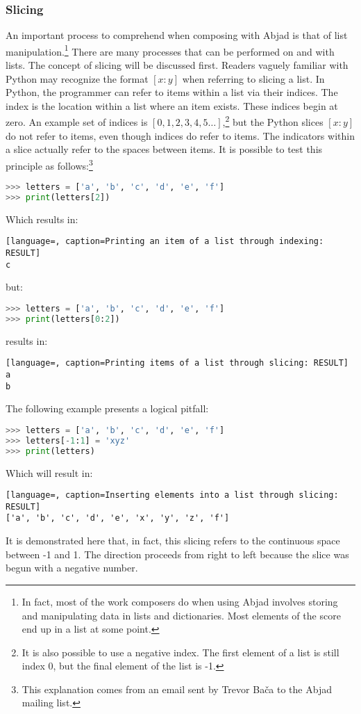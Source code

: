         \subsubsection{Slicing}
An important process to comprehend when composing with Abjad is that of list manipulation.\footnote{In fact, most of the work composers do when using Abjad involves storing and manipulating data in lists and dictionaries. Most elements of the score end up in a list at some point.} There are many processes that can be performed on and with lists. The concept of slicing will be discussed first. Readers vaguely familiar with Python may recognize the format $[x:y]$ when referring to slicing a list. In Python, the programmer can refer to items within a list via their indices. The index is the location within a list where an item exists. These indices begin at zero. An example set of indices is $[0, 1, 2, 3, 4, 5 …]$,\footnote{It is also possible to use a negative index. The first element of a list is still index 0, but the final element of the list is -1.} but the Python slices $[x:y]$ do not refer to items, even though indices do refer to items. The indicators within a slice actually refer to the spaces between items. It is possible to test this principle as follows:\footnote{This explanation comes from an email sent by Trevor Ba\v{c}a to the Abjad mailing list.}
\singlespace
\begin{lstlisting}[language=Python, caption=Printing an item of a list through indexing]
>>> letters = ['a', 'b', 'c', 'd', 'e', 'f']
>>> print(letters[2])
\end{lstlisting}
\doublespace
Which results in:
\singlespace
\begin{lstlisting}[language=, caption=Printing an item of a list through indexing: RESULT]
c
\end{lstlisting}
\doublespace
but:
\singlespace
\begin{lstlisting}[language=Python, caption=Printing items of a list through slicing]
>>> letters = ['a', 'b', 'c', 'd', 'e', 'f']
>>> print(letters[0:2])
\end{lstlisting}
\doublespace
results in:
\singlespace
\begin{lstlisting}[language=, caption=Printing items of a list through slicing: RESULT]
a
b
\end{lstlisting}
\doublespace
The following example presents a logical pitfall:
\singlespace
\begin{lstlisting}[language=Python, caption=Inserting elements into a list through slicing]
>>> letters = ['a', 'b', 'c', 'd', 'e', 'f']
>>> letters[-1:1] = 'xyz'
>>> print(letters)
\end{lstlisting}
\doublespace
Which will result in:
\singlespace
\begin{lstlisting}[language=, caption=Inserting elements into a list through slicing: RESULT]
['a', 'b', 'c', 'd', 'e', 'x', 'y', 'z', 'f']
\end{lstlisting}
\doublespace
It is demonstrated here that, in fact, this slicing refers to the continuous space between -1 and 1. The direction proceeds from right to left because the slice was begun with a negative number.


